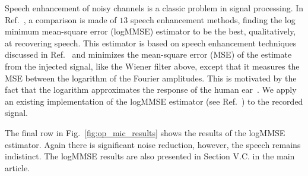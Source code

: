 \documentclass[aps,pra,superscriptaddress,reprint]{revtex4-2}
\begin{document}
Speech enhancement of noisy channels is a classic problem in signal processing. 
In Ref.~\cite{SubjectiveComparison}, a comparison is made of $13$ speech enhancement methods, finding the log minimum mean-square error (logMMSE) estimator to be the best, qualitatively, at recovering speech. 
This estimator is based on speech enhancement techniques discussed in Ref.~\cite{Ephraim1984SpeechEU_logMMSE} and minimizes the mean-square error (MSE) of the estimate from the injected signal, like the Wiener filter above, except that it measures the MSE between the logarithm of the Fourier amplitudes. This is motivated by the fact that the logarithm approximates the response of the human ear~\cite{SubjectiveComparison}. We apply an existing implementation of the logMMSE estimator (see Ref.~\cite{logmmse}) to the recorded signal.

The final row in Fig.~\ref{fig:op_mic_results} shows the results of the logMMSE estimator.
Again there is significant noise reduction, however, the speech remains indistinct.
The logMMSE results are also presented in Section V.C. in the main article. 





\end{document}
